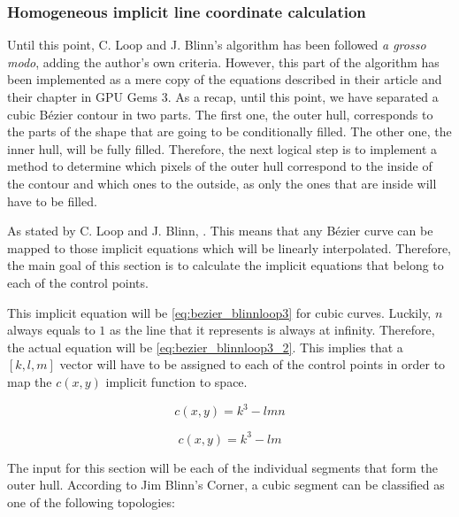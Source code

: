 \documentclass[\topdir/main.tex]{subfiles}
\begin{document}
\subsubsection{Homogeneous implicit line coordinate calculation}
Until this point, C. Loop and J. Blinn's algorithm has been followed \textit{a grosso modo}, adding the author's own criteria. However, this part of the algorithm has been implemented as a mere copy of the equations described in their article\cite{loopblinn2005} and their chapter in GPU Gems 3\cite{GPUGems3C26}. As a recap, until this point, we have separated a cubic Bézier contour in two parts. The first one, the outer hull, corresponds to the parts of the shape that are going to be conditionally filled. The other one, the inner hull, will be fully filled. Therefore, the next logical step is to implement a method to determine which pixels of the outer hull correspond to the inside of the contour and which ones to the outside, as only the ones that are inside will have to be filled.\newline

As stated by C. Loop and J. Blinn, \cite{loopblinn2005}. This means that any Bézier curve can be mapped to those implicit equations which will be linearly interpolated. Therefore, the main goal of this section is to calculate the implicit equations that belong to each of the control points.\newline

This implicit equation will be \eqref{eq:bezier_blinnloop3} for cubic curves. Luckily, $n$ always equals to $1$ as the line that it represents is always at infinity. Therefore, the actual equation will be \eqref{eq:bezier_blinnloop3_2}. This implies that a $[k, l, m]$ vector will have to be assigned to each of the control points in order to map the $c(x, y)$ implicit function to space.

\begin{equation} \label{eq:bezier_blinnloop3}
    c(x, y) = k^3 - lmn
\end{equation}

\begin{equation} \label{eq:bezier_blinnloop3_2}
    c(x, y) = k^3 - lm
\end{equation}



The input for this section will be each of the individual segments that form the outer hull. According to Jim Blinn's Corner\cite{blinn2002}, a cubic segment can be classified as one of the following topologies:
\end{document}
